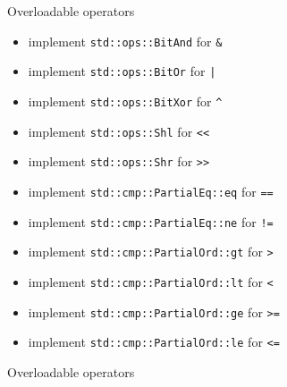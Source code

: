 \documentclass{beamer}
\begin{document}
\begin{frame}[fragile]{Overloadable operators}
  \begin{itemize}
    \item implement \texttt{std::ops::BitAnd} for \texttt{&}
    \item implement \texttt{std::ops::BitOr} for \texttt{|}
    \item implement \texttt{std::ops::BitXor} for \texttt{^}
    \item implement \texttt{std::ops::Shl} for \texttt{<<}
    \item implement \texttt{std::ops::Shr} for \texttt{>>}
    \item implement \texttt{std::cmp::PartialEq::eq} for \texttt{==}
    \item implement \texttt{std::cmp::PartialEq::ne} for \texttt{!=}
    \item implement \texttt{std::cmp::PartialOrd::gt} for \texttt{>}
    \item implement \texttt{std::cmp::PartialOrd::lt} for \texttt{<}
    \item implement \texttt{std::cmp::PartialOrd::ge} for \texttt{>=}
    \item implement \texttt{std::cmp::PartialOrd::le} for \texttt{<=}
  \end{itemize}
\end{frame}

\begin{frame}[fragile]{Overloadable operators}
\end{frame}
\end{document}
